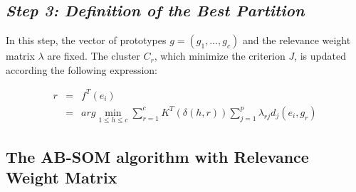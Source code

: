 \documentclass[10pt, conference, compsocconf]{IEEEtran}
\begin{document}
\subsection*{\textbf{\textit{Step 3: Definition of the Best Partition}}}

In this step, the vector of prototypes $g = (g_1, \dots, g_c)$ and the relevance weight matrix $\lambda$ are fixed. The cluster $C_r$, which minimize the criterion $J$, is updated according the following expression:

\begin{eqnarray}
r & = & f^T(e_i) \nonumber \\
& = & arg \min_{1\leq h\leq c} \sum_{r=1}^c K^T (\delta(h,r)) \sum_{j=1}^p \lambda_{rj} d_j(e_i, g_r)
\label{cluster}
\end{eqnarray}

\subsection{The AB-SOM algorithm with Relevance Weight Matrix}
\end{document}
